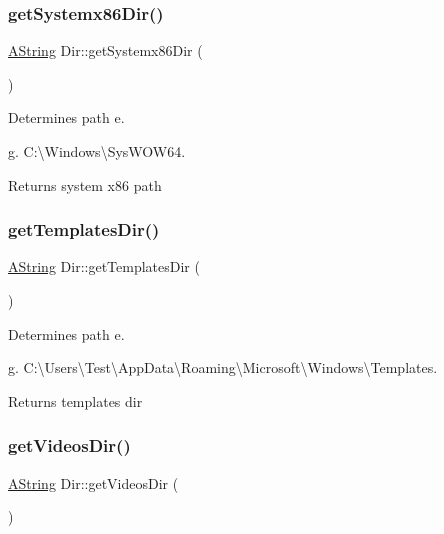 \subsubsection{\texorpdfstring{getSystemx86Dir()}{getSystemx86Dir()}}
{\footnotesize\ttfamily \mbox{\hyperlink{class_a_string}{A\+String}} Dir\+::get\+Systemx86\+Dir (\begin{DoxyParamCaption}{ }\end{DoxyParamCaption})\hspace{0.3cm}{\ttfamily [static]}}



Determines path e. 

g. C\+:\textbackslash{}\+Windows\textbackslash{}\+Sys\+W\+O\+W64. \begin{DoxyReturn}{Returns}
system x86 path 
\end{DoxyReturn}
\mbox{\label{class_dir_a4ed9072929fb9b93cd53ef91e01d26a4}} 
\subsubsection{\texorpdfstring{getTemplatesDir()}{getTemplatesDir()}}
{\footnotesize\ttfamily \mbox{\hyperlink{class_a_string}{A\+String}} Dir\+::get\+Templates\+Dir (\begin{DoxyParamCaption}{ }\end{DoxyParamCaption})\hspace{0.3cm}{\ttfamily [static]}}



Determines path e. 

g. C\+:\textbackslash{}\+Users\textbackslash{}\+Test\textbackslash{}\+App\+Data\textbackslash{}\+Roaming\textbackslash{}\+Microsoft\textbackslash{}\+Windows\textbackslash{}\+Templates. \begin{DoxyReturn}{Returns}
templates dir 
\end{DoxyReturn}
\mbox{\label{class_dir_afeb01994926f5733559cb8b5c7ca7192}} 
\subsubsection{\texorpdfstring{getVideosDir()}{getVideosDir()}}
{\footnotesize\ttfamily \mbox{\hyperlink{class_a_string}{A\+String}} Dir\+::get\+Videos\+Dir (\begin{DoxyParamCaption}{ }\end{DoxyParamCaption})\hspace{0.3cm}{\ttfamily [static]}}



